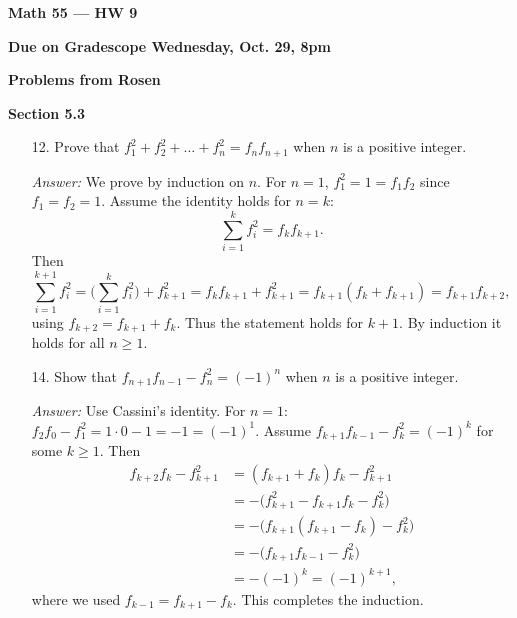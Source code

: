 \documentclass[11pt]{article}
\begin{document}
\begin{center}
{\Large \textbf{Math 55 — HW 9}}\\[6pt]
\end{center}

\vspace{0.75em}
\noindent \textbf{Due on Gradescope Wednesday, Oct. 29, 8pm}

\bigskip
\noindent \textbf{Problems from Rosen}

\medskip
\noindent \textbf{Section 5.3}
\begin{itemize}
    \item[12.] Prove that $f_1^2 + f_2^2 + \ldots + f_n^2 = f_n f_{n+1}$ when $n$ is a positive integer.

    \medskip\textit{Answer:}
    We prove by induction on $n$. For $n=1$, $f_1^2=1=f_1 f_2$ since $f_1=f_2=1$. Assume the identity holds for $n=k$:
    \[
      \sum_{i=1}^k f_i^2 = f_k f_{k+1}.
    \]
    Then
    \[
      \sum_{i=1}^{k+1} f_i^2
      = \Big(\sum_{i=1}^k f_i^2\Big)+f_{k+1}^2
      = f_k f_{k+1} + f_{k+1}^2
      = f_{k+1}(f_k+f_{k+1})
      = f_{k+1} f_{k+2},
    \]
    using $f_{k+2}=f_{k+1}+f_k$. Thus the statement holds for $k+1$. By induction it holds for all $n\ge1$.

    \item[14.] Show that $f_{n+1} f_{n-1} - f_n^{2} = (-1)^n$ when $n$ is a positive integer.

    \medskip\textit{Answer:}
    Use Cassini’s identity. For $n=1$: $f_2 f_0 - f_1^2 = 1\cdot0-1=-1=(-1)^1$.
    Assume $f_{k+1}f_{k-1}-f_k^2=(-1)^k$ for some $k\ge1$. Then
    \[
    \begin{aligned}
      f_{k+2}f_k - f_{k+1}^2
        &= (f_{k+1}+f_k)f_k - f_{k+1}^2 \\
        &= -\big(f_{k+1}^2 - f_{k+1}f_k - f_k^2\big) \\
        &= -\big(f_{k+1}(f_{k+1}-f_k) - f_k^2\big) \\
        &= -\big(f_{k+1}f_{k-1} - f_k^2\big) \\
        &= -(-1)^k = (-1)^{k+1},
    \end{aligned}
    \]
    where we used $f_{k-1}=f_{k+1}-f_k$. This completes the induction.
\end{itemize}
\end{document}
